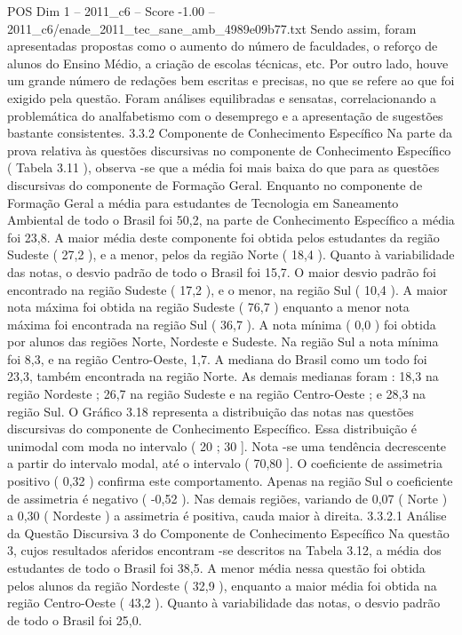 \begin{textsample}{POS Dim 1 – 2011\_c6 – Score -1.00 – 2011\_c6/enade\_2011\_tec\_sane\_amb\_4989e09b77.txt}
Sendo assim, foram apresentadas propostas como o aumento do número de faculdades, o reforço de alunos do Ensino Médio, a criação de escolas técnicas, etc.
Por outro lado, houve um grande número de redações bem escritas e precisas, no que se refere ao que foi exigido pela questão.
Foram análises equilibradas e sensatas, correlacionando a problemática do analfabetismo com o desemprego e a apresentação de sugestões bastante consistentes. 3.3.2 Componente de Conhecimento Específico Na parte da prova relativa às questões discursivas no componente de Conhecimento Específico ( Tabela 3.11 ), observa -se que a média foi mais baixa do que para as questões discursivas do componente de Formação Geral.
Enquanto no componente de Formação Geral a média para estudantes de Tecnologia em Saneamento Ambiental de todo o Brasil foi 50,2, na parte de Conhecimento Específico a média foi 23,8.
A maior média deste componente foi obtida pelos estudantes da região Sudeste ( 27,2 ), e a menor, pelos da região Norte ( 18,4 ).
Quanto à variabilidade das notas, o desvio padrão de todo o Brasil foi 15,7.
O maior desvio padrão foi encontrado na região Sudeste ( 17,2 ), e o menor, na região Sul ( 10,4 ).
A maior nota máxima foi obtida na região Sudeste ( 76,7 ) enquanto a menor nota máxima foi encontrada na região Sul ( 36,7 ).
A nota mínima ( 0,0 ) foi obtida por alunos das regiões Norte, Nordeste e Sudeste.
Na região Sul a nota mínima foi 8,3, e na região Centro-Oeste, 1,7.
A mediana do Brasil como um todo foi 23,3, também encontrada na região Norte.
As demais medianas foram : 18,3 na região Nordeste ; 26,7 na região Sudeste e na região Centro-Oeste ; e 28,3 na região Sul.
O Gráfico 3.18 representa a distribuição das notas nas questões discursivas do componente de Conhecimento Específico.
Essa distribuição é unimodal com moda no intervalo ( 20 ; 30 ].
Nota -se uma tendência decrescente a partir do intervalo modal, até o intervalo ( 70,80 ].
O coeficiente de assimetria positivo ( 0,32 ) confirma este comportamento.
Apenas na região Sul o coeficiente de assimetria é negativo ( -0,52 ).
Nas demais regiões, variando de 0,07 ( Norte ) a 0,30 ( Nordeste ) a assimetria é positiva, cauda maior à direita. 3.3.2.1 Análise da Questão Discursiva 3 do Componente de Conhecimento Específico Na questão 3, cujos resultados aferidos encontram -se descritos na Tabela 3.12, a média dos estudantes de todo o Brasil foi 38,5.
A menor média nessa questão foi obtida pelos alunos da região Nordeste ( 32,9 ), enquanto a maior média foi obtida na região Centro-Oeste ( 43,2 ).
Quanto à variabilidade das notas, o desvio padrão de todo o Brasil foi 25,0.

\end{textsample}
